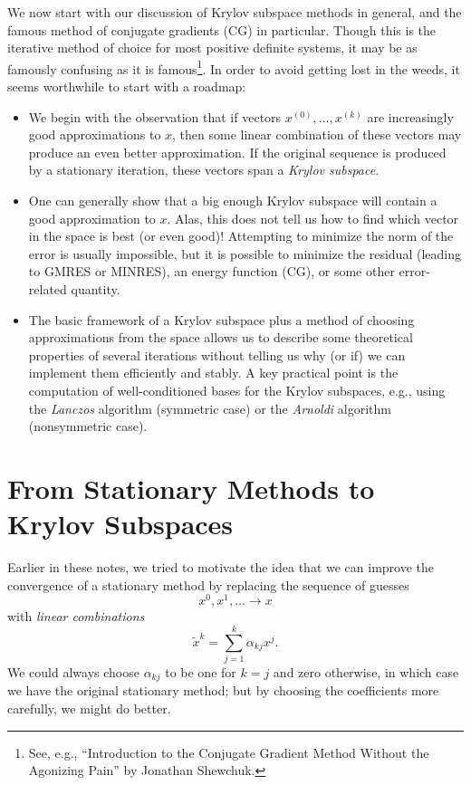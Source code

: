 \documentclass[12pt, leqno]{article}
\begin{document}
We now start with our discussion of Krylov subspace
methods in general, and the famous method of conjugate gradients (CG)
in particular.  Though this is the iterative method of choice for most
positive definite systems, it may be as famously confusing as it is
famous\footnote{%
  See, e.g., ``Introduction to the Conjugate Gradient
  Method Without the Agonizing Pain'' by Jonathan Shewchuk.}.
In order to avoid getting lost in the weeds, it seems worthwhile to
start with a roadmap:
\begin{itemize}
\item
  We begin with the observation that if vectors $x^{(0)}, \ldots,
  x^{(k)}$ are increasingly good approximations to $x$, then some
  linear combination of these vectors may produce an even better
  approximation.  If the original sequence is produced by a stationary
  iteration, these vectors span a {\em Krylov subspace}.
\item
  One can generally show that a big enough Krylov subspace will
  contain a good approximation to $x$.  Alas, this does not tell us
  how to find which vector in the space is best (or even good)!
  Attempting to minimize the norm of the error is usually impossible,
  but it is possible to minimize the residual (leading to GMRES or
  MINRES), an energy function (CG), or some other error-related
  quantity.
\item
  The basic framework of a Krylov subspace plus a method of choosing
  approximations from the space allows us to describe some theoretical
  properties of several iterations without telling us why (or if) we
  can implement them efficiently and stably.  A key practical point is
  the computation of well-conditioned bases for the Krylov subspaces,
  e.g., using the {\em Lanczos} algorithm (symmetric case) or the
  {\em Arnoldi} algorithm (nonsymmetric case).
\end{itemize}

\section{From Stationary Methods to Krylov Subspaces}

Earlier in these notes, we tried to motivate the idea that
we can improve the convergence of a stationary method by replacing
the sequence of guesses
\[
  x^0, x^1, \ldots \rightarrow x
\]
with {\em linear combinations}
\[
  \tilde{x}^k = \sum_{j=1}^k \alpha_{kj} x^j.
\]
We could always choose $\alpha_{kj}$ to be one for $k = j$ and zero
otherwise, in which case we have the original stationary method;
but by choosing the coefficients more carefully, we might do better.
\end{document}
